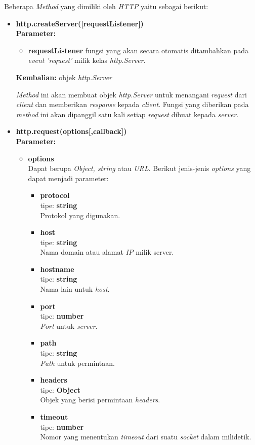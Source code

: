 Beberapa \textit{Method} yang dimiliki oleh \textit{HTTP} yaitu sebagai berikut:
\begin{itemize}
	\item \textbf{http.createServer([requestListener])} \\ \textbf{Parameter:}
	\begin{itemize}
		\item \textbf{requestListener} fungsi yang akan secara otomatis ditambahkan pada \textit{event} \textit{'request'} milik kelas \textit{http.Server}.
	\end{itemize}
	\textbf{Kembalian:} objek \textit{http.Server}
	
	\textit{Method} ini akan membuat objek \textit{http.Server} untuk menangani \textit{request} dari \textit{client} dan memberikan \textit{response} kepada \textit{client}. Fungsi yang diberikan pada \textit{method} ini akan dipanggil satu kali setiap \textit{request} dibuat kepada \textit{server}.
	
	\item \textbf{http.request(options[,callback])} \\ 
	\textbf{Parameter:}
	\begin{itemize}
		\item \textbf{options} \\ Dapat berupa \textit{Object, string} atau \textit{URL}. Berikut jenis-jenis \textit{options} yang dapat menjadi parameter:
		\begin{itemize}
			\item \textbf{protocol} \\tipe: \textbf{string} \\ Protokol yang digunakan.
			\item \textbf{host} \\tipe: \textbf{string} \\ Nama domain atau alamat \textit{IP} milik server.
			\item \textbf{hostname} \\tipe: \textbf{string} \\ Nama lain untuk \textit{host}.
			\item \textbf{port} \\tipe: \textbf{number} \\ \textit{Port} untuk \textit{server}.
			\item \textbf{path} \\tipe: \textbf{string} \\ \textit{Path} untuk permintaan.
			\item \textbf{headers} \\tipe: \textbf{Object} \\ Objek yang berisi permintaan \textit{headers}.
			\item \textbf{timeout} \\tipe: \textbf{number} \\ Nomor yang menentukan \textit{timeout} dari suatu \textit{socket} dalam milidetik.
		\end{itemize}
		

\end{itemize}
\end{itemize}
